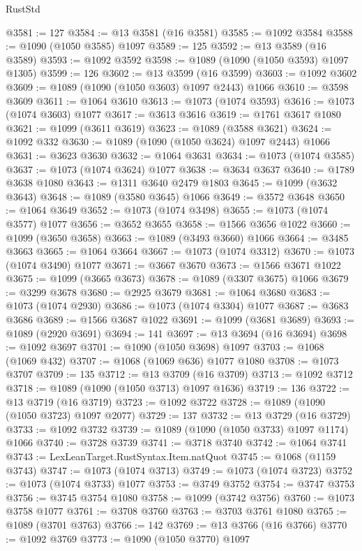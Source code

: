 \begin{lexlean}{RustStd}
\begin{coremodule}
@3581 := 127
@3584 := @13 @3581 (@16 @3581)
@3585 := @1092 @3584
@3588 := @1090 (@1050 @3585) @1097
@3589 := 125
@3592 := @13 @3589 (@16 @3589)
@3593 := @1092 @3592
@3598 := @1089 (@1090 (@1050 @3593) @1097 @1305)
@3599 := 126
@3602 := @13 @3599 (@16 @3599)
@3603 := @1092 @3602
@3609 := @1089 (@1090 (@1050 @3603) @1097 @2443) @1066
@3610 := @3598 @3609
@3611 := @1064 @3610
@3613 := @1073 (@1074 @3593)
@3616 := @1073 (@1074 @3603) @1077
@3617 := @3613 @3616
@3619 := @1761 @3617 @1080
@3621 := @1099 (@3611 @3619)
@3623 := @1089 (@3588 @3621)
@3624 := @1092 @332
@3630 := @1089 (@1090 (@1050 @3624) @1097 @2443) @1066
@3631 := @3623 @3630
@3632 := @1064 @3631
@3634 := @1073 (@1074 @3585)
@3637 := @1073 (@1074 @3624) @1077
@3638 := @3634 @3637
@3640 := @1789 @3638 @1080
@3643 := @1311 @3640 @2479 @1803
@3645 := @1099 (@3632 @3643)
@3648 := @1089 (@3580 @3645) @1066
@3649 := @3572 @3648
@3650 := @1064 @3649
@3652 := @1073 (@1074 @3498)
@3655 := @1073 (@1074 @3577) @1077
@3656 := @3652 @3655
@3658 := @1566 @3656 @1022
@3660 := @1099 (@3650 @3658)
@3663 := @1089 (@3493 @3660) @1066
@3664 := @3485 @3663
@3665 := @1064 @3664
@3667 := @1073 (@1074 @3312)
@3670 := @1073 (@1074 @3490) @1077
@3671 := @3667 @3670
@3673 := @1566 @3671 @1022
@3675 := @1099 (@3665 @3673)
@3678 := @1089 (@3307 @3675) @1066
@3679 := @3299 @3678
@3680 := @2925 @3679
@3681 := @1064 @3680
@3683 := @1073 (@1074 @2930)
@3686 := @1073 (@1074 @3304) @1077
@3687 := @3683 @3686
@3689 := @1566 @3687 @1022
@3691 := @1099 (@3681 @3689)
@3693 := @1089 (@2920 @3691)
@3694 := 141
@3697 := @13 @3694 (@16 @3694)
@3698 := @1092 @3697
@3701 := @1090 (@1050 @3698) @1097
@3703 := @1068 (@1069 @432)
@3707 := @1068 (@1069 @636) @1077 @1080
@3708 := @1073 @3707
@3709 := 135
@3712 := @13 @3709 (@16 @3709)
@3713 := @1092 @3712
@3718 := @1089 (@1090 (@1050 @3713) @1097 @1636)
@3719 := 136
@3722 := @13 @3719 (@16 @3719)
@3723 := @1092 @3722
@3728 := @1089 (@1090 (@1050 @3723) @1097 @2077)
@3729 := 137
@3732 := @13 @3729 (@16 @3729)
@3733 := @1092 @3732
@3739 := @1089 (@1090 (@1050 @3733) @1097 @1174) @1066
@3740 := @3728 @3739
@3741 := @3718 @3740
@3742 := @1064 @3741
@3743 := LexLeanTarget.RustSyntax.Item.natQuot
@3745 := @1068 (@1159 @3743)
@3747 := @1073 (@1074 @3713)
@3749 := @1073 (@1074 @3723)
@3752 := @1073 (@1074 @3733) @1077
@3753 := @3749 @3752
@3754 := @3747 @3753
@3756 := @3745 @3754 @1080
@3758 := @1099 (@3742 @3756)
@3760 := @1073 @3758 @1077
@3761 := @3708 @3760
@3763 := @3703 @3761 @1080
@3765 := @1089 (@3701 @3763)
@3766 := 142
@3769 := @13 @3766 (@16 @3766)
@3770 := @1092 @3769
@3773 := @1090 (@1050 @3770) @1097

\end{coremodule}
\end{lexlean}
